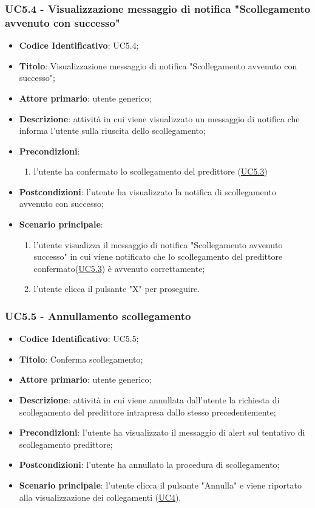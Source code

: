 	\label{par:UC5.4}
	\subsubsection{UC5.4 - Visualizzazione messaggio di notifica "Scollegamento avvenuto con successo"}
		\begin{itemize}
			\item\textbf{Codice Identificativo}: UC5.4;
			\item\textbf{Titolo}: Visualizzazione messaggio di notifica "Scollegamento avvenuto con successo";
			\item\textbf{Attore primario}: utente generico;
			\item\textbf{Descrizione}: attività in cui viene visualizzato un messaggio di notifica che informa l'utente sulla riuscita dello scollegamento; 
			\item\textbf{Precondizioni}: 
				\begin{enumerate}
					\item l'utente ha confermato lo scollegamento del predittore (\hyperref[par:UC5.3]{UC5.3})
				\end{enumerate}
			\item\textbf{Postcondizioni}: l'utente ha visualizzato la notifica di scollegamento avvenuto con successo;				
			\item\textbf{Scenario principale}:
				\begin{enumerate}
					\item l'utente visualizza il messaggio di notifica "Scollegamento avvenuto successo" in cui viene notificato che lo scollegamento del predittore confermato(\hyperref[par:UC5.3]{UC5.3}) è avvenuto correttamente;
					\item l'utente clicca il pulsante "X" per proseguire.		
				\end{enumerate}		
		\end{itemize}

\label{par:UC5.5}
	\subsubsection{UC5.5 - Annullamento scollegamento}
		\begin{itemize}
			\item\textbf{Codice Identificativo}: UC5.5;
			\item\textbf{Titolo}: Conferma scollegamento;
			\item\textbf{Attore primario}: utente generico;
			\item\textbf{Descrizione}: attività in cui viene annullata dall'utente la richiesta di scollegamento del predittore intrapresa dallo stesso precedentemente;
			\item\textbf{Precondizioni}: l'utente ha visualizzato il messaggio di alert sul tentativo di scollegamento predittore;
			\item\textbf{Postcondizioni}: l'utente ha annullato la procedura di scollegamento;	
			\item\textbf{Scenario principale}: l'utente clicca il pulsante "Annulla" e viene riportato alla visualizzazione dei collegamenti (\hyperref[par:UC4]{UC4}).
			\end{itemize}
			
